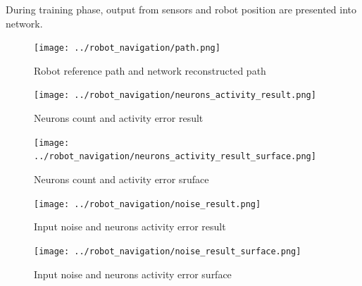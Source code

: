 \documentclass[10pt,a4paper]{article}
\begin{document}
During training phase, output from sensors and robot position are presented into network.



\begin{figure}[ht]
  \centering
  \texttt{[image: ../robot\_navigation/path.png]}
  \caption{Robot reference path and network reconstructed path}
  \label{fig:robot_path}
\end{figure}



\begin{figure}[ht]
\centering
\begin{minipage}[b]{.6\textwidth}

  \centering
  \texttt{[image: ../robot\_navigation/neurons\_activity\_result.png]}
  \caption{Neurons count and activity error result}
  \label{fig:navigation_neurons_count}

\end{minipage} %
\begin{minipage}[b]{.3\textwidth}

  \centering
  \texttt{[image: ../robot\_navigation/neurons\_activity\_result\_surface.png]}
  \caption{Neurons count and activity error sruface}
  \label{fig:navigation_neurons_count_surface}

\end{minipage}
\end{figure}




\begin{figure}[ht]
\centering
\begin{minipage}[b]{.6\textwidth}

  \centering
  \texttt{[image: ../robot\_navigation/noise\_result.png]}
  \caption{Input noise and neurons activity error result}
  \label{fig:navigation_neurons_count_noise}

\end{minipage} %
\begin{minipage}[b]{.3\textwidth}

  \centering
  \texttt{[image: ../robot\_navigation/noise\_result\_surface.png]}
  \caption{Input noise and neurons activity error surface}
  \label{fig:navigation_neurons_count_noise_surface}

\end{minipage}
\end{figure}
\end{document}
